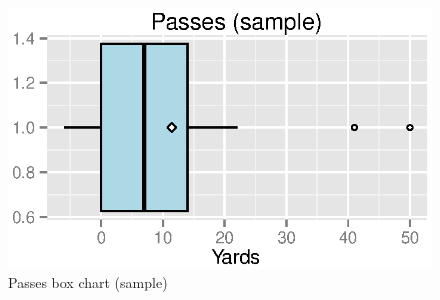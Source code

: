 \documentclass{exam}
\begin{document}
  \begin{figure}[H]
    \centering
    \includegraphics{figures/nfl/sample_passes_box.eps}
    \caption{Passes box chart (sample)}
  \end{figure}




\end{document}
